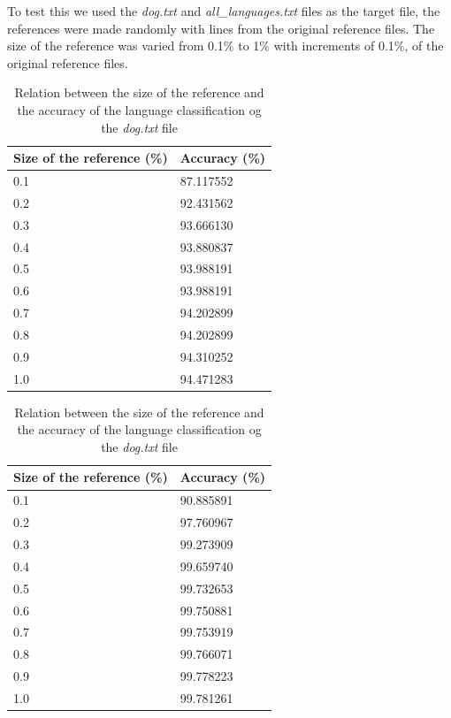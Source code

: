 \documentclass{article}
\begin{document}
To test this we used the \textit{dog.txt} and \textit{all_languages.txt} files as the target file, the references were made randomly with lines from the original 
reference files. The size of the reference was varied from 0.1\% to 1\% with increments of 0.1\%, of the original reference files.

\begin{table}[H]
    \centering
    \begin{tabular}{|l|l|}
    \hline
        Size of the reference (\%) & Accuracy (\%) \\ \hline
        0.1 & 87.117552 \\ \hline
        0.2 & 92.431562 \\ \hline
        0.3 & 93.666130 \\ \hline
        0.4 & 93.880837 \\ \hline
        0.5 & 93.988191 \\ \hline
        0.6 & 93.988191 \\ \hline
        0.7 & 94.202899 \\ \hline
        0.8 & 94.202899 \\ \hline
        0.9 & 94.310252 \\ \hline
        1.0 & 94.471283 \\ \hline
    \end{tabular}
    \caption{Relation between the size of the reference and the accuracy of the language classification og the \textit{dog.txt} file}
    \label{tab:rel_size_ref_acc_dog}
\end{table}


\begin{table}[H]
    \centering
    \begin{tabular}{|l|l|}
    \hline
        Size of the reference (\%) & Accuracy (\%) \\ \hline
        0.1 & 90.885891 \\ \hline
        0.2 & 97.760967 \\ \hline
        0.3 & 99.273909 \\ \hline
        0.4 & 99.659740 \\ \hline
        0.5 & 99.732653 \\ \hline
        0.6 & 99.750881 \\ \hline
        0.7 & 99.753919 \\ \hline
        0.8 & 99.766071 \\ \hline
        0.9 & 99.778223 \\ \hline
        1.0 & 99.781261 \\ \hline
    \end{tabular}
    \caption{Relation between the size of the reference and the accuracy of the language classification og the \textit{dog.txt} file}
    \label{tab:rel_size_ref_acc_all}
\end{table}
\end{document}

